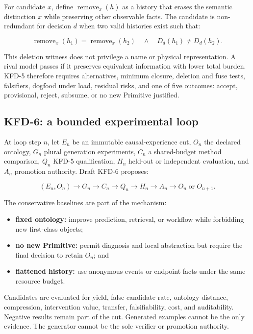 For candidate $x$, define $\operatorname{remove}_x(h)$ as a history that erases
the semantic distinction $x$ while preserving other observable facts. The
candidate is non-redundant for decision $d$ when two valid histories exist such
that:

\begin{equation}
\operatorname{remove}_x(h_1)=\operatorname{remove}_x(h_2)
\quad \land \quad
D_d(h_1) \ne D_d(h_2).
\end{equation}

This deletion witness does not privilege a name or physical representation. A
rival model passes if it preserves equivalent information with lower total
burden. KFD-5 therefore requires alternatives, minimum closure, deletion and
fuse tests, falsifiers, dogfood under load, residual risks, and one of five
outcomes: accept, provisional, reject, subsume, or no new Primitive justified.

\subsection{KFD-6: a bounded experimental loop}

At loop step $n$, let $E_n$ be an immutable causal-experience cut, $O_n$ the
declared ontology, $G_n$ plural generation experiments, $C_n$ a shared-budget
method comparison, $Q_n$ KFD-5 qualification, $H_n$ held-out or independent
evaluation, and $A_n$ promotion authority. Draft KFD-6 proposes:

\begin{equation}
(E_n,O_n) \rightarrow G_n \rightarrow C_n \rightarrow Q_n
\rightarrow H_n \rightarrow A_n \rightarrow O_n \;\text{or}\; O_{n+1}.
\end{equation}

The conservative baselines are part of the mechanism:

\begin{itemize}[leftmargin=*]
  \item \textbf{fixed ontology:} improve prediction, retrieval, or workflow
        while forbidding new first-class objects;
  \item \textbf{no new Primitive:} permit diagnosis and local abstraction but
        require the final decision to retain $O_n$; and
  \item \textbf{flattened history:} use anonymous events or endpoint facts
        under the same resource budget.
\end{itemize}

Candidates are evaluated for yield, false-candidate rate, ontology distance,
compression, intervention value, transfer, falsifiability, cost, and
auditability. Negative results remain part of the cut. Generated examples
cannot be the only evidence. The generator cannot be the sole verifier or
promotion authority.

